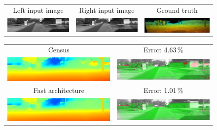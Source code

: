\documentclass[twoside,11pt]{article}
\begin{document}
\begin{figure}[p]
\setlength\tabcolsep{2pt}
\begin{center}
\begin{tabular}{ccc}%
\rule{0pt}{4ex}Left input image &
Right input image &
Ground truth \\
\includegraphics[scale=0.5]{img/kitti_000050_10L_.png} &
\includegraphics[scale=0.5]{img/kitti_000050_10R_.png} &
\includegraphics[scale=0.5]{img/kitti_50_gt_.png}\\
\end{tabular}

\begin{tabular}{cc}
Census &
Error: 4.63\,\% \\
\includegraphics[scale=0.5]{img/kitti_census_50_pred_.png} &
\includegraphics[scale=0.5]{img/kitti_census_50_err_.png}\\

Fast architecture &
Error: 1.01\,\% \\
\includegraphics[scale=0.5]{img/kitti_fast_50_pred_.png} &
\includegraphics[scale=0.5]{img/kitti_fast_50_err_.png} \\


\end{tabular}
\end{center}
\end{figure}
\end{document}
